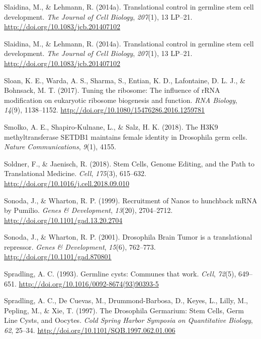 \documentclass[12pt,oneside]{reedthesis}
\newlength{\cslhangindent}
\newenvironment{cslreferences}%
  {\setlength{\parindent}{0pt}%
  \everypar{\setlength{\hangindent}{\cslhangindent}}\ignorespaces}%
  {\par}
\begin{document}
\begin{cslreferences}
\leavevmode\hypertarget{ref-Slaidina2014h}{}%
Slaidina, M., \& Lehmann, R. (2014a). Translational control in germline stem cell development. \emph{The Journal of Cell Biology}, \emph{207}(1), 13 LP--21. \url{http://doi.org/10.1083/jcb.201407102}

\leavevmode\hypertarget{ref-Slaidina2014h}{}%
Slaidina, M., \& Lehmann, R. (2014a). Translational control in germline stem cell development. \emph{The Journal of Cell Biology}, \emph{207}(1), 13 LP--21. \url{http://doi.org/10.1083/jcb.201407102}

\leavevmode\hypertarget{ref-Sloan2017e}{}%
Sloan, K. E., Warda, A. S., Sharma, S., Entian, K. D., Lafontaine, D. L. J., \& Bohnsack, M. T. (2017). Tuning the ribosome: The influence of rRNA modification on eukaryotic ribosome biogenesis and function. \emph{RNA Biology}, \emph{14}(9), 1138--1152. \url{http://doi.org/10.1080/15476286.2016.1259781}

\leavevmode\hypertarget{ref-Smolko2018}{}%
Smolko, A. E., Shapiro-Kulnane, L., \& Salz, H. K. (2018). The H3K9 methyltransferase SETDB1 maintains female identity in Drosophila germ cells. \emph{Nature Communications}, \emph{9}(1), 4155.

\leavevmode\hypertarget{ref-Soldner2018d}{}%
Soldner, F., \& Jaenisch, R. (2018). Stem Cells, Genome Editing, and the Path to Translational Medicine. \emph{Cell}, \emph{175}(3), 615--632. \url{http://doi.org/10.1016/j.cell.2018.09.010}

\leavevmode\hypertarget{ref-Sonoda1999a}{}%
Sonoda, J., \& Wharton, R. P. (1999). Recruitment of Nanos to hunchback mRNA by Pumilio. \emph{Genes \& Development}, \emph{13}(20), 2704--2712. \url{http://doi.org/10.1101/gad.13.20.2704}

\leavevmode\hypertarget{ref-Sonoda2001d}{}%
Sonoda, J., \& Wharton, R. P. (2001). Drosophila Brain Tumor is a translational repressor. \emph{Genes \& Development}, \emph{15}(6), 762--773. \url{http://doi.org/10.1101/gad.870801}

\leavevmode\hypertarget{ref-Spradling1993b}{}%
Spradling, A. C. (1993). Germline cysts: Communes that work. \emph{Cell}, \emph{72}(5), 649--651. \url{http://doi.org/10.1016/0092-8674(93)90393-5}

\leavevmode\hypertarget{ref-Spradling1997e}{}%
Spradling, A. C., De Cuevas, M., Drummond-Barbosa, D., Keyes, L., Lilly, M., Pepling, M., \& Xie, T. (1997). The Drosophila Germarium: Stem Cells, Germ Line Cysts, and Oocytes. \emph{Cold Spring Harbor Symposia on Quantitative Biology}, \emph{62}, 25--34. \url{http://doi.org/10.1101/SQB.1997.062.01.006}


\end{cslreferences}
\end{document}
